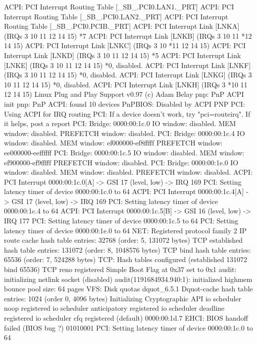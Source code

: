 \documentclass[mingoth,a4paper]{jsarticle}
\begin{document}
{{{{{{{{{{\begin{commandline}
ACPI: PCI Interrupt Routing Table [\_SB_.PCI0.LAN1._PRT]
ACPI: PCI Interrupt Routing Table [\_SB_.PCI0.LAN2._PRT]
ACPI: PCI Interrupt Routing Table [\_SB_.PCI0.PCIB._PRT]
ACPI: PCI Interrupt Link [LNKA] (IRQs 3 10 11 12 14 15) *7
ACPI: PCI Interrupt Link [LNKB] (IRQs 3 10 11 *12 14 15)
ACPI: PCI Interrupt Link [LNKC] (IRQs 3 10 *11 12 14 15)
ACPI: PCI Interrupt Link [LNKD] (IRQs 3 10 11 12 14 15) *5
ACPI: PCI Interrupt Link [LNKE] (IRQs 3 10 11 12 14 15) *0, disabled.
ACPI: PCI Interrupt Link [LNKF] (IRQs 3 10 11 12 14 15) *0, disabled.
ACPI: PCI Interrupt Link [LNKG] (IRQs 3 10 11 12 14 15) *0, disabled.
ACPI: PCI Interrupt Link [LNKH] (IRQs 3 *10 11 12 14 15)
Linux Plug and Play Support v0.97 (c) Adam Belay
pnp: PnP ACPI init
pnp: PnP ACPI: found 10 devices
PnPBIOS: Disabled by ACPI PNP
PCI: Using ACPI for IRQ routing
PCI: If a device doesn't work, try "pci=routeirq".  If it helps, post a report
PCI: Bridge: 0000:00:1c.0
  IO window: disabled.
  MEM window: disabled.
  PREFETCH window: disabled.
PCI: Bridge: 0000:00:1c.4
  IO window: disabled.
  MEM window: ef000000-ef8fffff
  PREFETCH window: ee000000-eeffffff
PCI: Bridge: 0000:00:1c.5
  IO window: disabled.
  MEM window: ef900000-ef9fffff
  PREFETCH window: disabled.
PCI: Bridge: 0000:00:1e.0
  IO window: disabled.
  MEM window: disabled.
  PREFETCH window: disabled.
ACPI: PCI Interrupt 0000:00:1c.0[A] -> GSI 17 (level, low) -> IRQ 169
PCI: Setting latency timer of device 0000:00:1c.0 to 64
ACPI: PCI Interrupt 0000:00:1c.4[A] -> GSI 17 (level, low) -> IRQ 169
PCI: Setting latency timer of device 0000:00:1c.4 to 64
ACPI: PCI Interrupt 0000:00:1c.5[B] -> GSI 16 (level, low) -> IRQ 177
PCI: Setting latency timer of device 0000:00:1c.5 to 64
PCI: Setting latency timer of device 0000:00:1e.0 to 64
NET: Registered protocol family 2
IP route cache hash table entries: 32768 (order: 5, 131072 bytes)
TCP established hash table entries: 131072 (order: 8, 1048576 bytes)
TCP bind hash table entries: 65536 (order: 7, 524288 bytes)
TCP: Hash tables configured (established 131072 bind 65536)
TCP reno registered
Simple Boot Flag at 0x37 set to 0x1
audit: initializing netlink socket (disabled)
audit(1191684934.940:1): initialized
highmem bounce pool size: 64 pages
VFS: Disk quotas dquot_6.5.1
Dquot-cache hash table entries: 1024 (order 0, 4096 bytes)
Initializing Cryptographic API
io scheduler noop registered
io scheduler anticipatory registered
io scheduler deadline registered
io scheduler cfq registered (default)
0000:00:1d.7 EHCI: BIOS handoff failed (BIOS bug ?) 01010001
PCI: Setting latency timer of device 0000:00:1c.0 to 64

\end{commandline}}}}}}}}}}}
\end{document}
